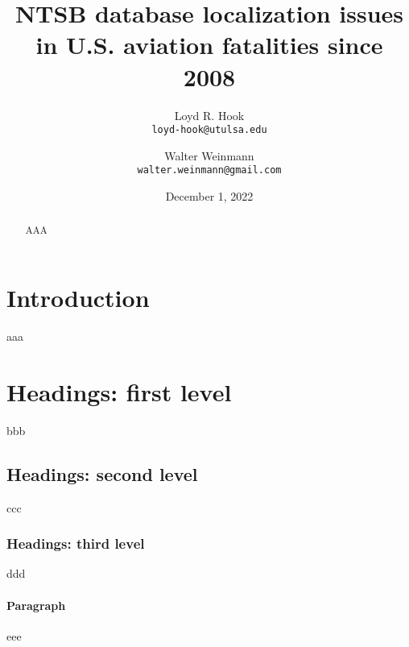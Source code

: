 \documentclass{article}
\title{NTSB database localization issues in U.S. aviation fatalities since 2008}
\date{December 1, 2022}
\author{Loyd R. Hook\\
        \texttt{loyd-hook@utulsa.edu}
        \and 
        Walter Weinmann\\
        \texttt{walter.weinmann@gmail.com}}
\begin{document}
\maketitle

\begin{abstract}
	AAA\cite{avall}
\end{abstract}


\section{Introduction}
aaa

\section{Headings: first level}
bbb\cite{Pre2008}

\subsection{Headings: second level}
ccc

\subsubsection{Headings: third level}
ddd

\paragraph{Paragraph}
eee




\end{document}
